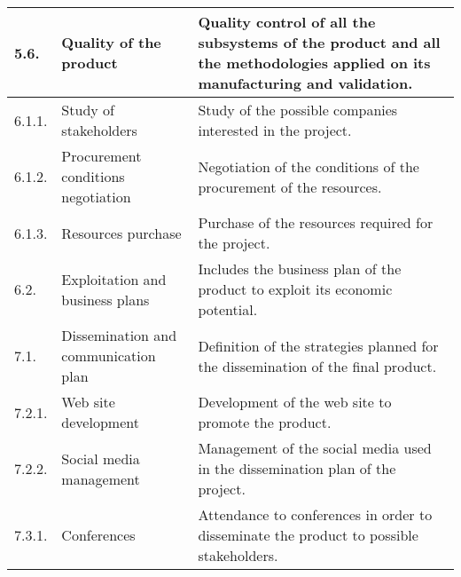 \begin{longtable}[H]{l >{\raggedright\arraybackslash}p{4cm} p{8cm}}
	\midrule
	
	5.6. & Quality of the product & Quality control of all the subsystems of the product and all the methodologies applied on its manufacturing and validation.\vspace{0.2cm} \\
	
	\midrule
	
	6.1.1. & Study of stakeholders & Study of the possible companies interested in the project.\vspace{0.2cm} \\
	
	\midrule
	
	6.1.2. & Procurement conditions negotiation & Negotiation of the conditions of the procurement of the resources.\vspace{0.2cm} \\
	
	\midrule
	
	6.1.3. & Resources purchase & Purchase of the resources required for the project.\vspace{0.2cm} \\
	
	\midrule
	
	6.2. & Exploitation and business plans & Includes the business plan of the product to exploit its economic potential.\vspace{0.2cm} \\

	\midrule
	
	7.1. & Dissemination and communication plan & Definition of the strategies planned for the dissemination of the final product.\vspace{0.2cm} \\
	
	\midrule
	
	7.2.1. & Web site development & Development of the web site to promote the product.\vspace{0.2cm} \\
	
	\midrule
	
	7.2.2. & Social media management & Management of the social media used in the dissemination plan of the project.\vspace{0.2cm} \\
	
	\midrule
	
	7.3.1. & Conferences & Attendance to conferences in order to disseminate the product to possible stakeholders.\vspace{0.2cm} \\
	

\end{longtable}
